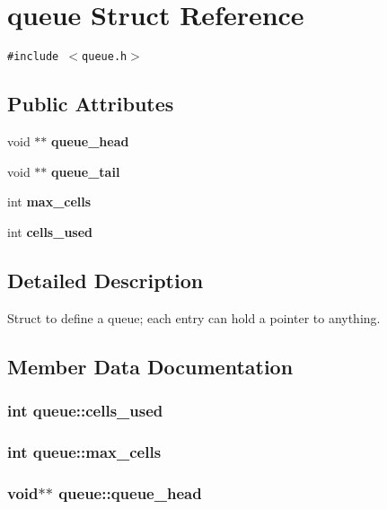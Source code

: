\section{queue Struct Reference}
\label{structqueue}
{\tt \#include $<$queue.h$>$}

\subsection*{Public Attributes}
\begin{CompactItemize}
\item 
void $\ast$$\ast$ \bf{queue\_\-head}
\item 
void $\ast$$\ast$ \bf{queue\_\-tail}
\item 
int \bf{max\_\-cells}
\item 
int \bf{cells\_\-used}
\end{CompactItemize}


\subsection{Detailed Description}
Struct to define a queue; each entry can hold a pointer to anything. 



\subsection{Member Data Documentation}
\subsubsection{\setlength{\rightskip}{0pt plus 5cm}int \bf{queue::cells\_\-used}}\label{structqueue_89ecd413e62ae3b9b968e782e81a60a4}


\subsubsection{\setlength{\rightskip}{0pt plus 5cm}int \bf{queue::max\_\-cells}}\label{structqueue_11da4ef0040f95b6cb18b12169fb3899}


\subsubsection{\setlength{\rightskip}{0pt plus 5cm}void$\ast$$\ast$ \bf{queue::queue\_\-head}}\label{structqueue_0d1accf5645bdae33523de8d77e9b78d}


